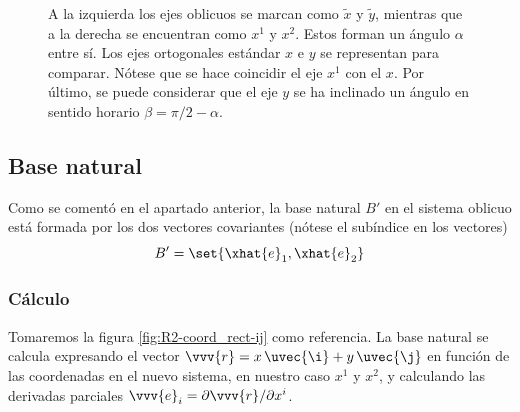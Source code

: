 \begin{figure}[ht]
  \caption{A la izquierda los ejes oblicuos se marcan como $\tilde{x}$ y $\tilde{y}$,
    mientras que a la derecha se encuentran como $x^1$ y $x^2$.
  Estos forman un ángulo $\alpha$ entre sí. Los ejes ortogonales estándar $x$ e $y$ se
  representan para comparar. Nótese que se hace coincidir el eje $x^1$ con el $x$.
  Por último, se puede considerar que el eje $y$ se ha inclinado un ángulo en sentido
  horario $\beta = \pi/2 - \alpha$.}
  \label{fig:R2-oblic_ejes}
\end{figure}


\subsection{Base natural}
Como se comentó en el apartado anterior, la base natural $B'$ en el sistema oblicuo está
formada por los dos vectores covariantes (nótese el subíndice en los vectores)
\begin{equation}\label{eq:R2-oblic_base}
  B' = \set{\xhat{e}_1, \xhat{e}_2}
\end{equation}

\subsubsection{Cálculo}
Tomaremos la figura \ref{fig:R2-coord_rect-ij} como referencia.
La base natural se calcula expresando el vector $\vvv{r}=x\,\uvec{\i}+y\,\uvec{\j}$ en
función de las coordenadas en el nuevo sistema, en nuestro caso $x^1$ y $x^2$, y
calculando las derivadas parciales $\vvv{e}_i = \partial\vvv{r}/\partial x^i$.

